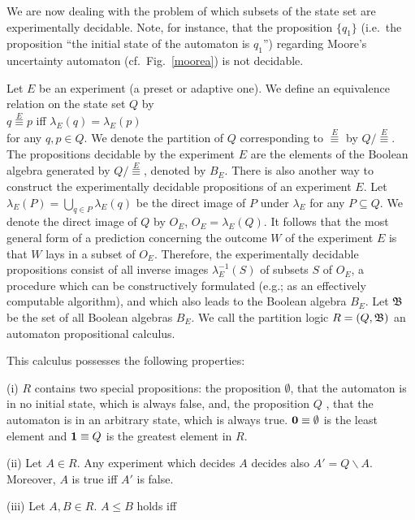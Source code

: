 We are now dealing with the problem of which subsets of the state set
are experimentally decidable.
Note, for instance,
that the proposition $\{q_1\}$ (i.e.~the proposition ``the initial
state of the automaton is $q_1$'') regarding Moore's uncertainty
automaton (cf.~Fig.~\ref{moorea}) is not decidable.

\begin{defin}
Let $E$ be an experiment (a preset or adaptive one).
We define an equivalence relation on the state set $Q$ by \\
$q \stackrel{E}{\equiv} p$ iff $\lambda_E(q) = \lambda_E(p)$ \\
for any $q,p \in Q$.
We denote the partition of $Q$ corresponding to $\stackrel{E}{\equiv}$
by $Q/\stackrel{E}{\equiv}$.
The propositions decidable by the experiment $E$ are
the elements of the Boolean algebra generated by $Q/\stackrel{E}{\equiv}$,
denoted by $B_E$.
There is also another way to construct the experimentally decidable
propositions of an experiment $E$.
Let $\lambda_E(P)  = \bigcup\limits_{q \in P}\lambda_E(q)$ be the direct
image of $P$ under $\lambda_E$ for any $P \subseteq Q$.
We denote the direct image of $Q$ by $O_E$, $O_E = \lambda_E(Q)$.
It follows that the most general form of a prediction concerning
the outcome $W$ of the experiment $E$ is that $W$ lays in a subset of
$O_E$.
Therefore, the experimentally decidable propositions consist of all
inverse images $\lambda_E^{-1}(S)$ of subsets $S$ of $O_E$,
a procedure which can be constructively formulated (e.g.; as an
effectively computable algorithm), and which also
leads to the Boolean algebra $B_E$.
Let ${\frak B}$ be the set of all Boolean algebras $B_E$.
We call the partition logic $R= (Q,{\frak B})$ an automaton propositional
calculus.
\end{defin}

This calculus possesses the following properties:

(i) $R$ contains two special propositions:
the proposition $\emptyset$, that the automaton is in no initial state,
which is always false, and,
the proposition $Q$ , that the automaton is in an arbitrary state,
which is always true.
${\bf 0} \equiv \emptyset$ is the least element and
${\bf 1} \equiv Q$ is the
greatest element in $R$.

(ii) Let $A \in R$. Any experiment which decides $A$ decides also $A' = Q
\backslash A$.
Moreover, $A$ is true iff $A'$ is false.

(iii) Let $A,B \in R$. $A \leq B$ holds iff

